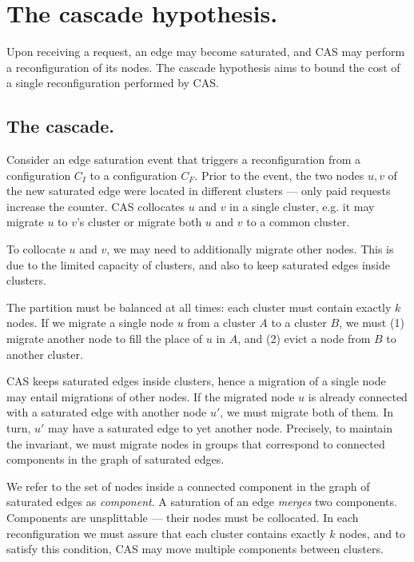 \documentclass[a4paper,USenglish]{lipics-v2019}
\newcommand{\DET}{\textsf{CAS}\xspace}
\begin{document}
\section{The cascade hypothesis.}

Upon receiving a request, an edge may become saturated, 
and \DET may perform a reconfiguration of its nodes.
The cascade hypothesis aims to bound the cost of a single reconfiguration performed by \DET.

\subsection{The cascade.}

Consider an edge saturation event that triggers a reconfiguration from a configuration $C_I$ to a configuration $C_F$.
Prior to the event, the two nodes $u,v$ of the new saturated edge were located in different clusters --- only paid requests increase the counter.
\DET collocates $u$ and $v$ in a single cluster, e.g. it may migrate $u$ to $v$'s cluster or migrate both $u$ and $v$ to a common cluster.

To collocate $u$ and $v$, we may need to additionally migrate other nodes.
This is due to the limited capacity of clusters, and also to keep saturated edges inside clusters.
    
The partition must be balanced at all times: each cluster must contain exactly $k$ nodes. If we migrate a single node $u$ from a cluster $A$ to a cluster $B$, we must (1) migrate another node to fill the place of $u$ in $A$, and (2) evict a node from $B$ to another cluster.

\DET keeps saturated edges inside clusters, hence a migration of a single node may entail migrations of other nodes.
If the migrated node $u$ is already connected with a saturated edge with another node $u'$, we must migrate both of them. In turn, $u'$ may have a saturated edge to yet another node. Precisely, to maintain the invariant, we must migrate nodes in groups that correspond to connected components in the graph of saturated edges.

We refer to the set of nodes inside a connected component in the graph of saturated edges as \emph{component}.
A saturation of an edge \emph{merges} two components.
Components are unsplittable --- their nodes must be collocated.
In each reconfiguration we must assure that each cluster contains exactly $k$ nodes, and to satisfy this condition, \DET may move multiple components between clusters.
\end{document}
